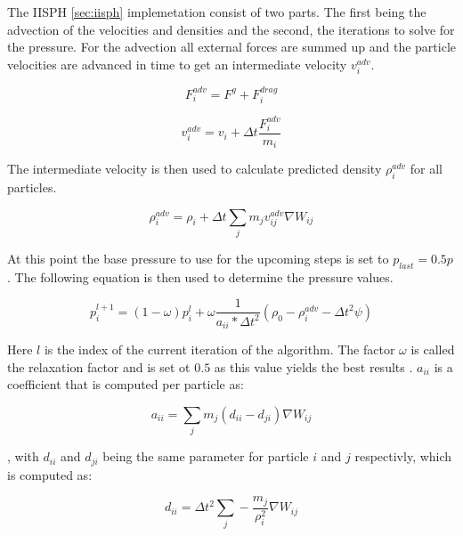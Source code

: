 \documentclass[intern]{cgMA}
\begin{document}
    The IISPH \ref{sec:iisph} implemetation consist of two parts. The first being the advection of the velocities and densities and the second, the iterations to solve for the pressure. For the advection all external forces are summed up and the particle velocities are advanced in time to get an intermediate velocity $v_i^{adv}$. \cite{6570475}

    \begin{equation}
        F_i^{adv} = F^g + F_i^{drag}
    \end{equation}

    \begin{equation}
        v_i^{adv} = v_i + \Delta t \frac{F_i^{adv}}{m_i}
    \end{equation}

    The intermediate velocity is then used to calculate predicted density $\rho_i^{adv}$ for all particles. \cite{6570475}

    \begin{equation}
        \rho_i^{adv} = \rho_i + \Delta t \sum_j m_j v_{ij}^{adv} \nabla W_{ij}
    \end{equation}
    
    At this point the base pressure to use for the upcoming steps is set to $p_{last} = 0.5p$ \cite{6570475}. The following equation is then used to determine the pressure values.

    \begin{equation}
        p_i^{l+1} = (1 - \omega) p_i^l + \omega \frac{1}{a_{ii} * \Delta t^2} (\rho_0 - \rho_i^{adv} - \Delta t^2 \psi)
    \end{equation}

    Here $l$ is the index of the current iteration of the algorithm. The factor $\omega$ is called the relaxation factor and is set ot $0.5$ as this value yields the best results \cite{6570475}. $a_{ii}$ is a coefficient that is computed per particle as: 

    \begin{equation}
        a_{ii} = \sum_j m_j (d_{ii} - d_{ji}) \nabla W_{ij}
    \end{equation}

    , with $d_{ii}$ and $d_{ji}$ being the same parameter for particle $i$ and $j$ respectivly, which is computed as:

    \begin{equation}
        d_{ii} = \Delta t^2 \sum_j -\frac{m_j}{\rho_i^2} \nabla W_{ij}
    \end{equation}
\end{document}
